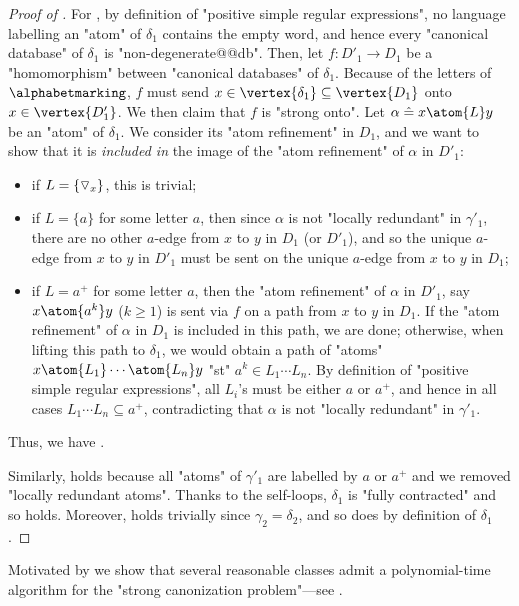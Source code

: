 \begin{proof}[Proof of ]
	For \axiomStrongCanonCore{}, by definition of "positive simple regular expressions",
	no language labelling an "atom" of $\delta_1$ contains the empty word, and hence
	every "canonical database" of $\delta_1$ is "non-degenerate@@db".
	Then, let $f\colon D'_1 \to D_1$ be a "homomorphism" between "canonical databases"
	of $\delta_1$. Because of the letters of $\alphabetmarking$,
	$f$ must send $x \in \vertex{\delta_1} \subseteq \vertex{D_1}$
	onto $x \in \vertex{D'_1}$. We then claim that $f$ is "strong onto".
	Let $\alpha \defeq x \atom{L} y$ be an "atom" of $\delta_1$.
	We consider its "atom refinement" in $D_1$, and we want to show that it is
	\emph{included in} the image of the "atom refinement" of $\alpha$ in $D'_1$:
	\begin{itemize}
		\item if $L = \{\triangledown_x\}$, this is trivial;
		\item if $L = \{a\}$ for some letter $a$, then since
			$\alpha$ is not "locally redundant" in $\gamma'_1$,
			there are no other $a$-edge from $x$ to $y$ in $D_1$ (or $D'_1$),
			and so the unique $a$-edge from $x$ to $y$ in $D'_1$
			must be sent on the unique $a$-edge from $x$ to $y$ in $D_1$;
		\item if $L = a^+$ for some letter $a$, then the "atom refinement" of $\alpha$ in
			$D'_1$, say $x \atom{a^k} y$ ($k \geq 1$) is sent via $f$ on a path
			from $x$ to $y$ in $D_1$. If the "atom refinement" of $\alpha$ in $D_1$
			is included in this path, we are done; otherwise, when lifting
			this path to $\delta_1$, we would obtain a path of "atoms"
			$x \atom{L_1} \cdots \atom{L_n} y$ "st" $a^k \in L_1\cdots L_n$.
			By definition of "positive simple regular expressions", all $L_i$'s must
			be either $a$ or $a^+$, and hence in all cases $L_1 \cdots L_n \subseteq a^+$,
			contradicting that $\alpha$ is not "locally redundant" in $\gamma'_1$. 
	\end{itemize}
	Thus, we have \axiomStrongCanonCore{}.

	Similarly, \axiomCanonNonRed{} holds because all "atoms" of $\gamma'_1$ are labelled
	by $a$ or $a^+$ and we removed "locally redundant atoms".
	Thanks to the self-loops, $\delta_1$ is "fully contracted" and so \axiomCanonContracted{} holds.
	Moreover, \axiomCanonContainment{} holds trivially since $\gamma_2 = \delta_2$,
	and so does \axiomCanonMarking{} by definition of $\delta_1$.
\end{proof}

Motivated by 
we show that several reasonable classes admit
a polynomial-time algorithm for the "strong canonization problem"---see
.

